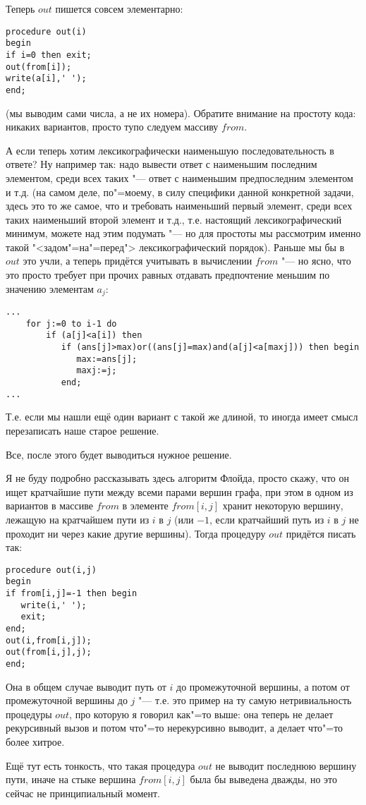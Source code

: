Теперь $out$ пишется совсем элементарно:
\begin{codesampleo}\begin{verbatim}
procedure out(i)
begin
if i=0 then exit;
out(from[i]);
write(a[i],' ');
end;
\end{verbatim}
\end{codesampleo}
(мы выводим сами числа, а не их номера). Обратите внимание на простоту кода: никаких вариантов, просто тупо следуем массиву $from$.

А если теперь хотим лексикографически наименьшую последовательность в ответе? Ну например так: надо вывести ответ с наименьшим последним элементом, среди всех таких "--- ответ с наименьшим предпоследним элементом и т.д. (на самом деле, по"=моему, в силу специфики данной конкретной задачи, здесь это то же самое, что и требовать наименьший первый элемент, среди всех таких наименьший второй элемент и т.д., т.е. настоящий лексикографический минимум, можете над этим подумать "--- но для простоты мы рассмотрим именно такой "<задом"=на"=перед"> лексикографический порядок). Раньше мы бы в $out$ это учли, а теперь придётся учитывать в вычислении $from$ "--- но ясно, что это просто требует при прочих равных отдавать предпочтение меньшим по значению элементам $a_j$:
\begin{codesampleo}\begin{verbatim}
...
    for j:=0 to i-1 do
        if (a[j]<a[i]) then
           if (ans[j]>max)or((ans[j]=max)and(a[j]<a[maxj])) then begin
              max:=ans[j];
              maxj:=j;
           end;
...
\end{verbatim}
\end{codesampleo}
Т.е. если мы нашли ещё один вариант с такой же длиной, то иногда имеет смысл перезаписать наше старое решение.

Все, после этого будет выводиться нужное решение.

Я не буду подробно рассказывать здесь алгоритм Флойда, просто скажу, что он ищет кратчайшие пути между всеми парами вершин графа, при этом в одном из вариантов в массиве $from$ в элементе $from[i,j]$ хранит некоторую вершину, лежащую на кратчайшем пути из $i$ в $j$ (или $-1$, если кратчайший путь из $i$ в $j$ не проходит ни через какие другие вершины). Тогда процедуру $out$ придётся писать так:
\begin{codesampleo}\begin{verbatim}
procedure out(i,j)
begin
if from[i,j]=-1 then begin
   write(i,' ');
   exit;
end;
out(i,from[i,j]);
out(from[i,j],j);
end;
\end{verbatim}
\end{codesampleo}

Она в общем случае выводит путь от $i$ до промежуточной вершины, а потом от промежуточной вершины до $j$ "--- т.е. это пример на ту самую нетривиальность процедуры $out$, про которую я говорил как"=то выше: она теперь не делает рекурсивный вызов и потом что"=то нерекурсивно выводит, а делает что"=то более хитрое.

Ещё тут есть тонкость, что такая процедура $out$ не выводит последнюю вершину пути, иначе на стыке вершина $from[i,j]$ была бы выведена дважды, но это сейчас не принципиальный момент.
